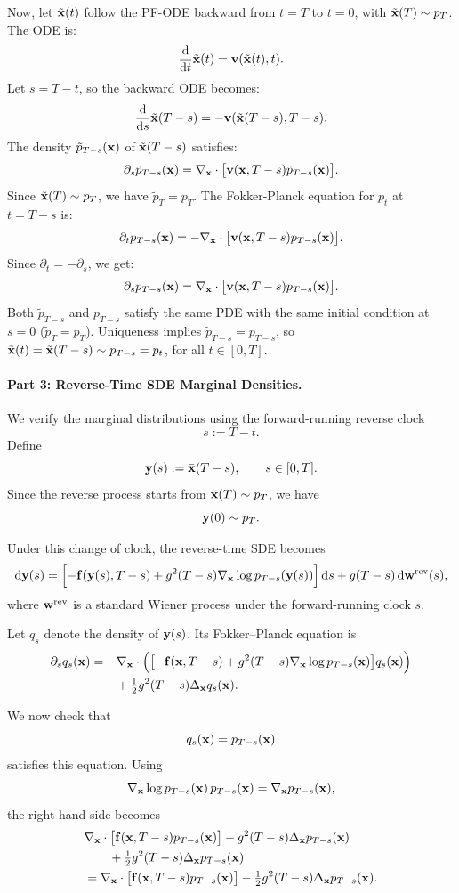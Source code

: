 \vspace{0.3cm}
 Now, let $\tilde{{\mathbf{x}}}(t)$ follow the PF-ODE backward from $t = T$ to $t = 0$, with $\tilde{{\mathbf{x}}}(T) \sim p_T$. The ODE is:
\[
\frac{\mathop{}\!\mathrm{d}}{\mathop{}\!\mathrm{d} t} \tilde{{\mathbf{x}}}(t) = {\mathbf{v}}(\tilde{{\mathbf{x}}}(t), t).
\]
Let $s = T - t$, so the backward ODE becomes:
\[
\frac{\mathop{}\!\mathrm{d}}{\mathop{}\!\mathrm{d} s} \tilde{{\mathbf{x}}}(T - s) = -{\mathbf{v}}(\tilde{{\mathbf{x}}}(T - s), T - s).
\]
The density $\tilde p_{T-s}({\mathbf{x}})$ of $\tilde{{\mathbf{x}}}(T - s)$ satisfies:
\[
\partial_s \tilde p_{T-s}({\mathbf{x}}) = \nabla_{{\mathbf{x}}} \cdot \bigl[ {\mathbf{v}}({\mathbf{x}}, T - s) \tilde p_{T-s}({\mathbf{x}}) \bigr].
\]
Since $\tilde{{\mathbf{x}}}(T) \sim p_T$, we have $\tilde p_T = p_T$. The Fokker-Planck equation for $p_t$ at $t = T - s$ is:
\[
\partial_t p_{T-s}({\mathbf{x}}) = -\nabla_{{\mathbf{x}}} \cdot \bigl[ {\mathbf{v}}({\mathbf{x}}, T - s) p_{T-s}({\mathbf{x}}) \bigr].
\]
Since $\partial_t = -\partial_s$, we get:
\[
\partial_s p_{T-s}({\mathbf{x}}) = \nabla_{{\mathbf{x}}} \cdot \bigl[ {\mathbf{v}}({\mathbf{x}}, T - s) p_{T-s}({\mathbf{x}}) \bigr].
\]
Both $\tilde p_{T-s}$ and $p_{T-s}$ satisfy the same PDE with the same initial condition at $s = 0$ ($\tilde p_T = p_T$). Uniqueness implies $\tilde p_{T-s} = p_{T-s}$, so $\tilde{{\mathbf{x}}}(t) = \tilde{{\mathbf{x}}}(T - s) \sim p_{T-s} = p_t$, for all $t \in [0, T]$.

\paragraph{Part 3: Reverse-Time SDE Marginal Densities.}
We verify the marginal distributions using the forward-running reverse clock
\[
s:=T-t.
\]
Define
\[
{\mathbf{y}}(s):=\bar{{\mathbf{x}}}(T-s),
\qquad s\in[0,T].
\]
Since the reverse process starts from $\bar{{\mathbf{x}}}(T)\sim p_T$, we have
\[
{\mathbf{y}}(0)\sim p_T.
\]

Under this change of clock, the reverse-time SDE becomes
\[
\mathop{}\!\mathrm{d}{\mathbf{y}}(s)
=
\Bigl[
-{\mathbf{f}}({\mathbf{y}}(s),T-s)
+
g^2(T-s)\nabla_{{\mathbf{x}}}\log p_{T-s}({\mathbf{y}}(s))
\Bigr]\mathop{}\!\mathrm{d} s
+
g(T-s)\mathop{}\!\mathrm{d}{\mathbf{w}}^{\mathrm{rev}}(s),
\]
where ${\mathbf{w}}^{\mathrm{rev}}$ is a standard Wiener process under the
forward-running clock $s$.

Let $q_s$ denote the density of ${\mathbf{y}}(s)$. Its Fokker--Planck equation is
\begin{align*}
\partial_s q_s({\mathbf{x}})
&=
-\nabla_{{\mathbf{x}}}\cdot
\Bigl(
\bigl[
-{\mathbf{f}}({\mathbf{x}},T-s)
+
g^2(T-s)\nabla_{{\mathbf{x}}}\log p_{T-s}({\mathbf{x}})
\bigr]
q_s({\mathbf{x}})
\Bigr)
\\
&\qquad
+
\tfrac12 g^2(T-s)\Delta_{{\mathbf{x}}}q_s({\mathbf{x}}).
\end{align*}

We now check that
\[
q_s({\mathbf{x}})=p_{T-s}({\mathbf{x}})
\]
satisfies this equation. Using
\[
\nabla_{{\mathbf{x}}}\log p_{T-s}({\mathbf{x}})\,p_{T-s}({\mathbf{x}})
=
\nabla_{{\mathbf{x}}}p_{T-s}({\mathbf{x}}),
\]
the right-hand side becomes
\begin{align*}
&\nabla_{{\mathbf{x}}}\cdot
\bigl[
{\mathbf{f}}({\mathbf{x}},T-s)p_{T-s}({\mathbf{x}})
\bigr]
-
g^2(T-s)\Delta_{{\mathbf{x}}}p_{T-s}({\mathbf{x}})
\\
&\qquad
+
\tfrac12 g^2(T-s)\Delta_{{\mathbf{x}}}p_{T-s}({\mathbf{x}})
\\
&=
\nabla_{{\mathbf{x}}}\cdot
\bigl[
{\mathbf{f}}({\mathbf{x}},T-s)p_{T-s}({\mathbf{x}})
\bigr]
-
\tfrac12 g^2(T-s)\Delta_{{\mathbf{x}}}p_{T-s}({\mathbf{x}}).
\end{align*}

